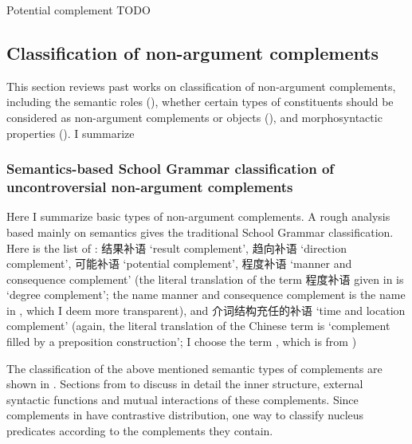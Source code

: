 \documentclass[../main.tex]{subfiles}
\begin{document}
Potential complement TODO

\subsection{Classification of non-argument complements}\label{sec:complement-classification}

This section reviews past works on classification of non-argument complements,
including the semantic roles (),
whether certain types of constituents should be considered as non-argument complements or objects 
(),
and morphosyntactic properties ().
I summarize %

\subsubsection{Semantics-based School Grammar classification of uncontroversial non-argument complements}\label{sec:complement-semantics}

Here I summarize basic types of non-argument complements. 
A rough analysis based mainly on semantics gives the traditional School Grammar classification.
Here is the list of \citet[]{xianhan2004}: 
结果补语 `result complement', 趋向补语 `direction complement', 可能补语 `potential complement',
程度补语 `manner and consequence complement'
(the literal translation of the term 程度补语 given in \citet{xianhan2004} is `degree complement';
the name manner and consequence complement is the name in \citet[10.3]{po2015chinese},
which I deem more transparent),
and 介词结构充任的补语 `time and location complement'
(again, the literal translation of the Chinese term is `complement filled by a preposition construction';
I choose the term , which is from ) %

The classification of the above mentioned semantic types of complements 
are shown in .
Sections from  to  
discuss in detail the inner structure, 
external syntactic functions 
and mutual interactions of these complements. 
Since complements in  have contrastive distribution, %
one way to classify nucleus predicates according to the complements they contain. 
\end{document}
